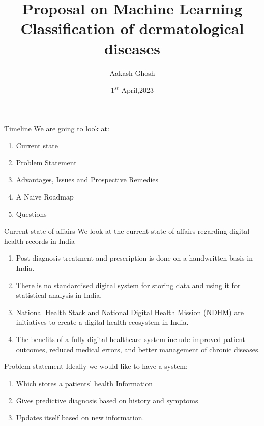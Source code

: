 \documentclass{beamer}
\title{Proposal on Machine Learning Classification of dermatological diseases}
\subtitle{}
\author{Aakash Ghosh}
\institute{19MS129}
\date{$1^{st}$ April,2023}
\begin{document}
\begin{frame}[plain]
\maketitle
\end{frame}

\begin{frame}{Timeline}    
    We are going to look at:
    \begin{enumerate}
        \item Current state
        \item Problem Statement
        \item Advantages, Issues and Prospective Remedies
        \item A Naive Roadmap
        \item Questions
    \end{enumerate}
\end{frame}




\begin{frame}{Current state of affairs}
    We look at the current state of affairs regarding digital health records in India\pause
    \begin{enumerate}
         \item Post diagnosis treatment and prescription is done on a handwritten basis in India.\pause
         \item There is no standardised digital system for storing data and using it for statistical analysis in India.\pause
         \item National Health Stack and National Digital Health Mission (NDHM) are initiatives to create a digital health ecosystem in India.\pause
         \item The benefits of a fully digital healthcare system include improved patient outcomes, reduced medical errors, and better management of chronic diseases.
    \end{enumerate}
\end{frame}
\begin{frame}{Problem statement}
    Ideally we would like to have a system:
    \begin{enumerate}
        \item Which stores a patients' health Information\pause
        \item Gives predictive diagnosis based on history and symptoms\pause
        \item Updates itself based on new information.
    \end{enumerate}
\end{frame}
\end{document}
